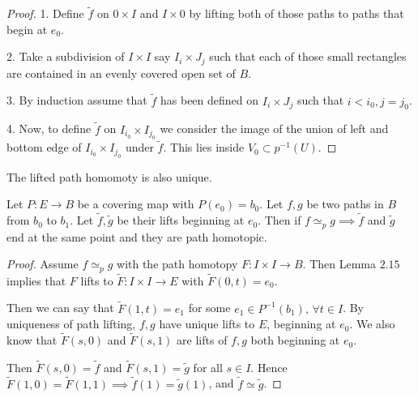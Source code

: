 \documentclass[12pt]{amsart}
\begin{document}
\begin{proof}


    1. Define $\widetilde{f}$ on $0 \times I$ and $I \times 0$ by lifting both of those paths to paths that begin at $e_0$. 

    2. Take a subdivision of $I \times I$ say $I_i \times J_j$ such that each of those small rectangles are contained in an evenly covered open set of $B$. 

    3. By induction assume that $\widetilde{f}$ has been defined on $I_i \times J_j$ such that $i < i_0, j = j_0$. 

    4. Now, to define $\widetilde{f}$ on $I_{i_0} \times I_{j_0}$ we consider the image of the union of left and bottom edge of $I_{i_0} \times I_{j_0}$ under $\widetilde{f}$. This lies inside $V_0 \subset p^{-1}(U)$.
\end{proof}
 
\begin{remark}
    The lifted path homomoty is also unique. 
\end{remark}

\begin{lemma}
    Let $P: E \to B$ be a covering map with $P(e_0) = b_0$. Let $f, g$ be two paths in $B$ from $b_0$ to $b_1$. Let $\widetilde{f}, \widetilde{g}$ be their lifts beginning at $e_0$. Then if $f \simeq_p g \implies \widetilde{f}$ and $\widetilde{g}$ end at the same point and they are path homotopic. 
\end{lemma}

\begin{proof}
    Assume $f \simeq_p g$ with the path homotopy $F : I \times I \to B$. Then Lemma $2.15$ implies that $F$ lifts to $\widetilde{F}: I \times I \to E$ with $\widetilde{F}(0,t) = e_0$.

    Then we can say that $\widetilde{F}(1, t) = e_1$ for some $e_1 \in P^{-1}(b_1), \, \forall t \in I$. 
    By uniqueness of path lifting, $f, g$ have unique lifts to $E$, beginning at $e_0$. We also know that $\widetilde{F}(s,0)$ and $\widetilde{F}(s,1)$ are lifts of $f, g$ both beginning at $e_0$. 

    Then $\widetilde{F}(s,  0) = \widetilde{f}$ and $\widetilde{F}(s,1) = \widetilde{g}$ for all $s \in I$. Hence $\widetilde{F}(1,0) = \widetilde{F}(1,1) \implies \widetilde{f}(1) = \widetilde{g}(1)$, and $\widetilde{f} \simeq \widetilde{g}$. 
\end{proof}
\end{document}

